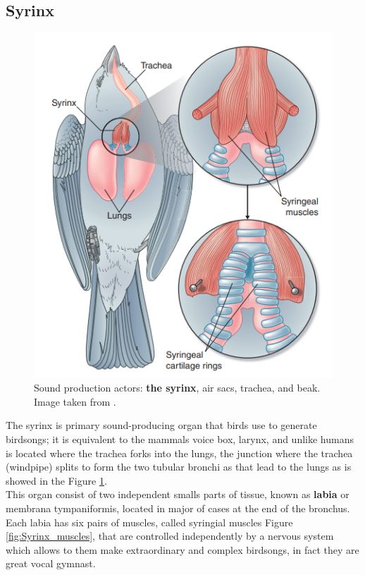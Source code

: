 \subsection{Syrinx}

\begin{minipage}{0.4\textwidth}
\begin{figure}[H]
    \centering
    \includegraphics[scale=0.65]{Images/birdsong_paloma.png}
    \caption{Sound production actors: \textbf{the  syrinx}, air sacs, trachea, and beak. Image taken from \cite{birds_handbook}.}
    \label{fig:syrinx_paloma}
\end{figure}
\end{minipage} \hspace{50pt}
\begin{minipage}{0.48\textwidth}
The syrinx is primary sound-producing organ that birds use to generate birdsongs; it is equivalent to the mammals voice box, larynx,
and unlike humans is located where the trachea forks into the lungs, the junction where the trachea (windpipe) splits to form the two tubular bronchi as that lead to the lungs as is showed in the Figure \ref{fig:syrinx_paloma}. \\

This organ consist of two independent smalls parts of tissue, known as \textbf{labia} or membrana tympaniformis, located in major of cases at the end of the bronchus. Each labia has six pairs of muscles, called syringial muscles Figure \ref{fig:Syrinx_muscles}, that are controlled independently by a nervous system which allows to them make extraordinary and complex birdsongs, in fact they are great vocal gymnast.
\end{minipage}


